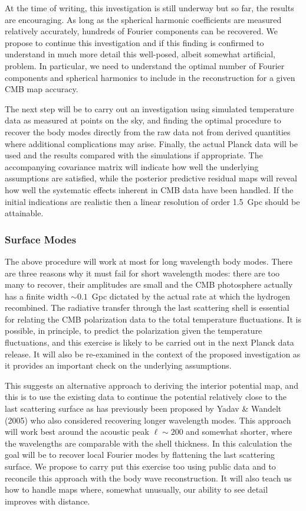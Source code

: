 \documentclass[psfig,11pt]{article}
\begin{document}
At the time of writing, this investigation is still underway but so far, the results are encouraging. As long as the spherical harmonic coefficients are measured relatively accurately, hundreds of Fourier components can be recovered. We propose to continue this investigation and if this finding is confirmed to understand in much more detail this well-posed, albeit somewhat artificial, problem. In particular, we need to understand  the optimal number of Fourier components and spherical harmonics to include in the reconstruction for a given CMB map accuracy.

The next step will be to carry out an investigation using simulated temperature data as measured at points on the sky, and finding the optimal procedure to recover the body modes directly from the raw data not from derived quantities where additional complications may arise. Finally, the actual Planck data will be used and the results compared with the simulations if appropriate. The accompanying covariance matrix will indicate how well the underlying assumptions are satisfied, while the posterior predictive residual maps will reveal how well the systematic effects inherent in CMB data have been handled. If the initial indications are realistic then a linear resolution of order 1.5~Gpc should be attainable.

\subsubsection{Surface Modes}

The above procedure will work at most for long wavelength body modes. There are three reasons why it must fail for short wavelength modes: there are too many to recover, their amplitudes are small and the CMB photosphere actually has a finite width  $\sim0.1$~Gpc dictated by the actual rate at which the hydrogen recombined. The radiative transfer through the last scattering shell is essential for relating the CMB polarization data to the total temperature fluctuations. It is possible, in principle, to predict the polarization given the temperature fluctuations, and this exercise is likely to be carried out in the next Planck data release. It will also be re-examined in the context of the proposed investigation as it provides an important check on the underlying assumptions.

This suggests an alternative approach to deriving the interior potential map, and this is to use the existing data to continue the potential relatively close to the last scattering surface as has previously been proposed by Yadav \& Wandelt (2005) who also considered recovering longer wavelength modes. This approach will work best around the acoustic peak $\ell\sim200$ and somewhat shorter, where the wavelengths are comparable with the shell thickness. In this calculation the goal will be to recover local Fourier modes by flattening the last scattering surface. We propose to carry put this exercise too using public data and to reconcile this approach with the body wave reconstruction. It will also teach us how to handle maps where, somewhat unusually, our ability to see detail improves with distance.
\end{document}
